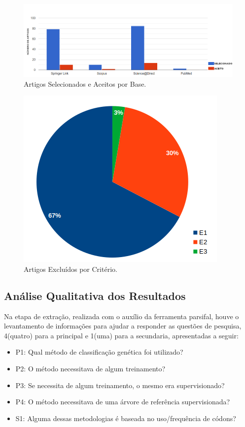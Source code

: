 \documentclass[12pt]{article}
\begin{document}
\begin{figure}[tb]
    \centering
    \includegraphics[scale=0.42]{figuras/_artigosAceitosSelecionados.png}
    \caption{Artigos Selecionados e Aceitos por Base.}\label{fig:artigoBases}
\end{figure}

\begin{figure}[tb]
    \centering
    \includegraphics[scale=0.5]{figuras/_artigosExcluidosPorCriterio.png}
    \caption{Artigos Excluídos por Critério.}\label{fig:excluidosCriterios}
\end{figure}


\subsection{Análise Qualitativa dos Resultados}

Na etapa de extração, realizada com o auxílio da ferramenta \gls{parsifal}, houve o levantamento de informações para ajudar a responder as questões de pesquisa, 4(quatro) para a principal e 1(uma) para a secundaria, apresentadas a seguir: \\

\begin{itemize}
    \item P1: Qual método de classificação genética foi utilizado?
    \item P2: O método necessitava de algum treinamento?
    \item P3: Se necessita de algum treinamento, o mesmo era supervisionado?
    \item P4: O método necessitava de uma árvore de referência supervisionada?
    \item S1: Alguma dessas metodologias é baseada no uso/frequência de códons?
\end{itemize}
\end{document}
